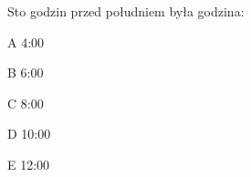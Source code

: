 \begin{tresc}
Sto godzin przed południem była godzina:
\end{tresc}
\begin{wariant}{A} 4:00 \end{wariant}
\begin{wariant}{B} 6:00 \end{wariant}
\begin{wariant}{C} 8:00 \end{wariant}
\begin{wariant}{D} 10:00 \end{wariant}
\begin{wariant}{E} 12:00 \end{wariant}
